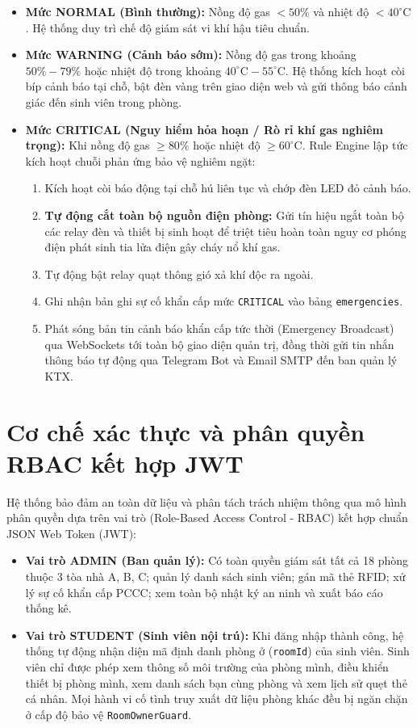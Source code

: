 \begin{itemize}
    \item \textbf{Mức NORMAL (Bình thường):} Nồng độ gas $< 50\%$ và nhiệt độ $< 40^\circ\text{C}$. Hệ thống duy trì chế độ giám sát vi khí hậu tiêu chuẩn.
    \item \textbf{Mức WARNING (Cảnh báo sớm):} Nồng độ gas trong khoảng $50\% - 79\%$ hoặc nhiệt độ trong khoảng $40^\circ\text{C} - 55^\circ\text{C}$. Hệ thống kích hoạt còi bíp cảnh báo tại chỗ, bật đèn vàng trên giao diện web và gửi thông báo cảnh giác đến sinh viên trong phòng.
    \item \textbf{Mức CRITICAL (Nguy hiểm hỏa hoạn / Rò rỉ khí gas nghiêm trọng):} Khi nồng độ gas $\ge 80\%$ hoặc nhiệt độ $\ge 60^\circ\text{C}$. Rule Engine lập tức kích hoạt chuỗi phản ứng bảo vệ nghiêm ngặt:
    \begin{enumerate}
        \item Kích hoạt còi báo động tại chỗ hú liên tục và chớp đèn LED đỏ cảnh báo.
        \item \textbf{Tự động cắt toàn bộ nguồn điện phòng:} Gửi tín hiệu ngắt toàn bộ các relay đèn và thiết bị sinh hoạt để triệt tiêu hoàn toàn nguy cơ phóng điện phát sinh tia lửa điện gây cháy nổ khí gas.
        \item Tự động bật relay quạt thông gió xả khí độc ra ngoài.
        \item Ghi nhận bản ghi sự cố khẩn cấp mức \texttt{CRITICAL} vào bảng \texttt{emergencies}.
        \item Phát sóng bản tin cảnh báo khẩn cấp tức thời (Emergency Broadcast) qua WebSockets tới toàn bộ giao diện quản trị, đồng thời gửi tin nhắn thông báo tự động qua Telegram Bot và Email SMTP đến ban quản lý KTX.
    \end{enumerate}
\end{itemize}

\section{Cơ chế xác thực và phân quyền RBAC kết hợp JWT}
\label{sec:rbac_jwt}

Hệ thống bảo đảm an toàn dữ liệu và phân tách trách nhiệm thông qua mô hình phân quyền dựa trên vai trò (Role-Based Access Control - RBAC) kết hợp chuẩn JSON Web Token (JWT):
\begin{itemize}
    \item \textbf{Vai trò ADMIN (Ban quản lý):} Có toàn quyền giám sát tất cả 18 phòng thuộc 3 tòa nhà A, B, C; quản lý danh sách sinh viên; gán mã thẻ RFID; xử lý sự cố khẩn cấp PCCC; xem toàn bộ nhật ký an ninh và xuất báo cáo thống kê.
    \item \textbf{Vai trò STUDENT (Sinh viên nội trú):} Khi đăng nhập thành công, hệ thống tự động nhận diện mã định danh phòng ở (\texttt{roomId}) của sinh viên. Sinh viên chỉ được phép xem thông số môi trường của phòng mình, điều khiển thiết bị phòng mình, xem danh sách bạn cùng phòng và xem lịch sử quẹt thẻ cá nhân. Mọi hành vi cố tình truy xuất dữ liệu phòng khác đều bị ngăn chặn ở cấp độ bảo vệ \texttt{RoomOwnerGuard}.
\end{itemize}

